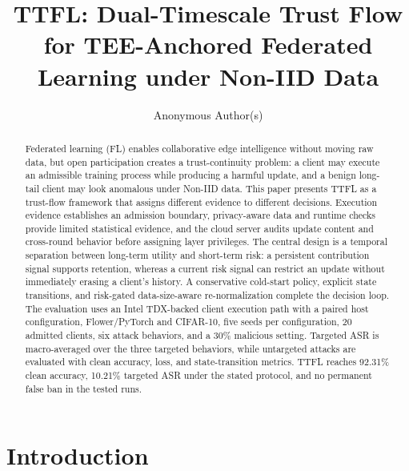\documentclass[runningheads,orivec]{llncs}
\begin{document}
\title{TTFL: Dual-Timescale Trust Flow for TEE-Anchored Federated Learning under Non-IID Data}

\author{Anonymous Author(s)}
\institute{}

\maketitle

\begin{abstract}
    Federated learning (FL) enables collaborative edge intelligence without moving raw data, but open participation creates a trust-continuity problem: a client may execute an admissible training process while producing a harmful update, and a benign long-tail client may look anomalous under Non-IID data. This paper presents TTFL as a trust-flow framework that assigns different evidence to different decisions. Execution evidence establishes an admission boundary, privacy-aware data and runtime checks provide limited statistical evidence, and the cloud server audits update content and cross-round behavior before assigning layer privileges. The central design is a temporal separation between long-term utility and short-term risk: a persistent contribution signal supports retention, whereas a current risk signal can restrict an update without immediately erasing a client's history. A conservative cold-start policy, explicit state transitions, and risk-gated data-size-aware re-normalization complete the decision loop. The evaluation uses an Intel TDX-backed client execution path with a paired host configuration, Flower/PyTorch and CIFAR-10, five seeds per configuration, 20 admitted clients, six attack behaviors, and a 30\% malicious setting. Targeted ASR is macro-averaged over the three targeted behaviors, while untargeted attacks are evaluated with clean accuracy, loss, and state-transition metrics. TTFL reaches 92.31\% clean accuracy, 10.21\% targeted ASR under the stated protocol, and no permanent false ban in the tested runs.
\end{abstract}

\section{Introduction}
\end{document}
